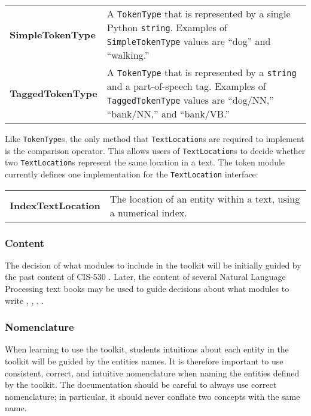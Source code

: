 \documentclass{article}
\begin{document}
\vspace{1.2mm}\noindent
\begin{tabular}{||p{}p{}}
  \textbf{SimpleTokenType} & A \texttt{TokenType} that is
  represented by a single Python \texttt{string}.  Examples of
  \texttt{SimpleTokenType} values are ``dog'' and ``walking.'' \\

  \textbf{TaggedTokenType} & A \texttt{TokenType} that is
  represented by a \texttt{string} and a part-of-speech tag.  Examples 
  of \texttt{TaggedTokenType} values are ``dog/NN,'' ``bank/NN,'' and
  ``bank/VB.'' \\
\end{tabular}
\vspace{1mm}

Like \texttt{TokenType}s, the only method that \texttt{TextLocation}s
are required to implement is the comparison operator.  This allows
users of \texttt{TextLocation}s to decide whether two
\texttt{TextLocation}s represent the same location in a text.  The
token module currently defines one implementation for the
\texttt{TextLocation} interface:

\vspace{1.2mm}\noindent
\begin{tabular}{||p{}p{}}
  \textbf{IndexTextLocation} & The location of an
  entity within a text, using a numerical index. \\
\end{tabular}
\vspace{1mm}

\subsubsection{Content}

The decision of what modules to include in the toolkit will be
initially guided by the past content of CIS-530 \cite{cis530}.  Later,
the content of several Natural Language Processing text books may be
used to guide decisions about what modules to write \cite{allen1995},
\cite{gazdar1989}, \cite{jurafsky2000}, \cite{manning2000}.

\subsubsection{Nomenclature}

When learning to use the toolkit, students intuitions about each
entity in the toolkit will be guided by the entities names.  It is
therefore important to use consistent, correct, and intuitive
nomenclature when naming the entities defined by the toolkit.
The documentation should be careful to always use correct
nomenclature; in particular, it should never conflate two concepts
with the same name.
\end{document}
